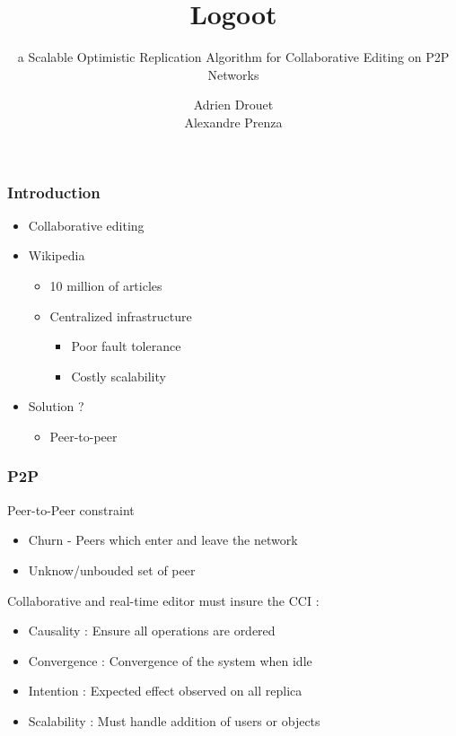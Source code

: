 \documentclass[14pt]{beamer}
\title{Logoot}
\subtitle{a Scalable Optimistic Replication Algorithm for Collaborative Editing on P2P Networks}
\author{Adrien Drouet\\
        Alexandre Prenza}
\begin{document}
  \begin{frame}
    \titlepage
  \end{frame}

	\begin{frame}
		\frametitle{Introduction}
		\begin{itemize}
			\item<1-> Collaborative editing
			\item <2->Wikipedia
				\begin{itemize}
					\item<3-> 10 million of articles
					\item<3-> Centralized infrastructure
					\begin{itemize}
						\item<4-> Poor fault tolerance
						\item<4-> Costly scalability
					\end{itemize}
				\end{itemize}
			\item<5-> Solution ?
			\begin{itemize}
						\item<6-> Peer-to-peer
			\end{itemize}
		\end{itemize}
	\end{frame}

	\begin{frame}
		\frametitle{P2P}
		Peer-to-Peer constraint
		\begin{itemize}
			\item Churn - Peers which enter and leave the network
			\item Unknow/unbouded set of peer
		\end{itemize}
		
		Collaborative and real-time editor must insure the CCI :
		\begin{itemize}
			\item<2-> Causality : Ensure all operations are ordered
			\item<2-> Convergence : Convergence of the system when idle
			\item<2-> Intention : Expected effect observed on all replica
			\item<2-> Scalability : Must handle addition of users or objects
		\end{itemize}
	\end{frame}
\end{document}
